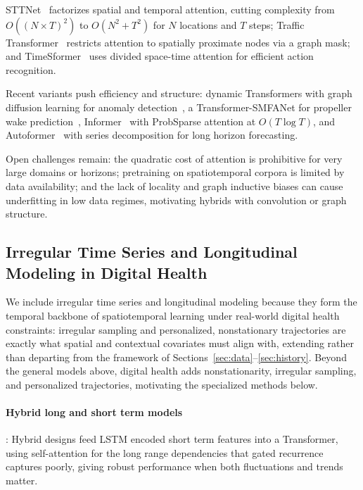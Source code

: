 \documentclass[journal]{IEEEtran}
\providecommand{\Description}[1]{}
\begin{document}
STTNet~\cite{xu2020stransformer} factorizes spatial and temporal attention, cutting complexity from $O((N \times T)^2)$ to $O(N^2 + T^2)$ for $N$ locations and $T$ steps; Traffic Transformer~\cite{cai2020traffic} restricts attention to spatially proximate nodes via a graph mask; and TimeSformer~\cite{bertasius2021timesformer} uses divided space-time attention for efficient action recognition.
 
Recent variants push efficiency and structure: dynamic Transformers with graph diffusion learning for anomaly detection~\cite{yu2025graph}, a Transformer-SMFANet for propeller wake prediction~\cite{wang2025propeller}, Informer~\cite{zhou2021informer} with ProbSparse attention at $O(T \log T)$, and Autoformer~\cite{wu2021autoformer} with series decomposition for long horizon forecasting.
 
Open challenges remain: the quadratic cost of attention is prohibitive for very large domains or horizons; pretraining on spatiotemporal corpora is limited by data availability; and the lack of locality and graph inductive biases can cause underfitting in low data regimes, motivating hybrids with convolution or graph structure.
 

 
 
\subsection{Irregular Time Series and Longitudinal Modeling in Digital Health}
We include irregular time series and longitudinal modeling because they form the temporal backbone of spatiotemporal learning under real-world digital health constraints: irregular sampling and personalized, nonstationary trajectories are exactly what spatial and contextual covariates must align with, extending rather than departing from the framework of Sections~\ref{sec:data}--\ref{sec:history}. Beyond the general models above, digital health adds nonstationarity, irregular sampling, and personalized trajectories, motivating the specialized methods below.

\paragraph{Hybrid long and short term models}: Hybrid designs feed LSTM encoded short term features into a Transformer, using self-attention for the long range dependencies that gated recurrence captures poorly, giving robust performance when both fluctuations and trends matter.
\end{document}
